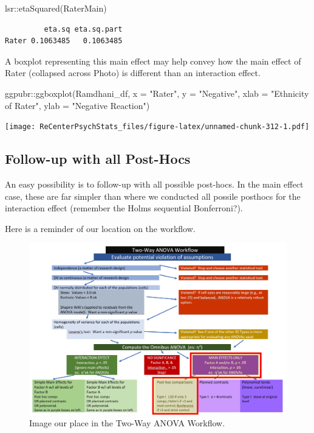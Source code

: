 \documentclass[
  11pt,
]{book}
\newenvironment{Shaded}{\begin{snugshade}}{\end{snugshade}}
\newcommand{\AttributeTok}[1]{\textcolor[rgb]{0.77,0.63,0.00}{#1}}
\newcommand{\FunctionTok}[1]{\textcolor[rgb]{0.00,0.00,0.00}{#1}}
\newcommand{\NormalTok}[1]{#1}
\newcommand{\SpecialCharTok}[1]{\textcolor[rgb]{0.00,0.00,0.00}{#1}}
\newcommand{\StringTok}[1]{\textcolor[rgb]{0.31,0.60,0.02}{#1}}
\begin{document}
\begin{Shaded}
\begin{Highlighting}[]
\NormalTok{lsr}\SpecialCharTok{::}\FunctionTok{etaSquared}\NormalTok{(RaterMain)}
\end{Highlighting}
\end{Shaded}

\begin{verbatim}
         eta.sq eta.sq.part
Rater 0.1063485   0.1063485
\end{verbatim}

A boxplot representing this main effect may help convey how the main effect of Rater (collapsed across Photo) is different than an interaction effect.

\begin{Shaded}
\begin{Highlighting}[]
\NormalTok{ggpubr}\SpecialCharTok{::}\FunctionTok{ggboxplot}\NormalTok{(Ramdhani\_df, }\AttributeTok{x =} \StringTok{"Rater"}\NormalTok{, }\AttributeTok{y =} \StringTok{"Negative"}\NormalTok{, }\AttributeTok{xlab =} \StringTok{"Ethnicity of Rater"}\NormalTok{,}
    \AttributeTok{ylab =} \StringTok{"Negative Reaction"}\NormalTok{)}
\end{Highlighting}
\end{Shaded}

\texttt{[image: ReCenterPsychStats\_files/figure-latex/unnamed-chunk-312-1.pdf]}

\hypertarget{follow-up-with-all-post-hocs}{%
\subsection{Follow-up with all Post-Hocs}\label{follow-up-with-all-post-hocs}}

An easy possibility is to follow-up with all possible post-hocs. In the main effect case, these are far simpler than where we conducted all possile posthocs for the interaction effect (remember the Holms sequential Bonferroni?).

Here is a reminder of our location on the workflow.

\begin{figure}
\centering
\includegraphics{images/factorial/wfMain_PH.jpg}
\caption{Image our place in the Two-Way ANOVA Workflow.}
\end{figure}
\end{document}
